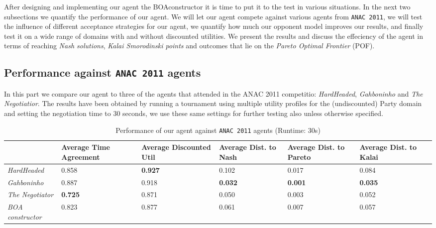 After designing and implementing our agent the BOAconstructor it is time to put it to the test in various situations. In the next two subsections we quantify the performance of our agent. 
We will let our agent compete against various agents from \texttt{ANAC 2011}, we will test the influence of different acceptance strategies for our agent,
we quantify how much our opponent model improves our results, and finally test it on a wide range of domains with and without discounted utilities.
We present the results and discuss the effeciency of the agent in terms of reaching \emph{Nash solutions}, \emph{Kalai Smorodinski points} and outcomes that lie on the \emph{Pareto Optimal Frontier} (POF).

\subsection{Performance against \texttt{ANAC 2011} agents}

In this part we compare our agent to three of the agents that attended in the ANAC 2011 competitio: \emph{HardHeaded}, \emph{Gahboninho} and \emph{The Negotiatior}. The results have been obtained by running a tournament using multiple utility profiles for the (undiscounted) Party domain and setting the negotiation time to $30$ seconds,
we use these same settings for further testing also unless otherwise specified. \\

\begin{table}
	\centering
	\small
    \begin{tabular}{l|p{2cm}|p{2cm}|p{2cm}|p{2cm}|p{2cm}|p{2cm}|}
    ~                                    & Average Time Agreement & Average Discounted Util & Average Dist. to Nash & Average Dist. to Pareto & Average Dist. to Kalai \\
    \hline
    \emph{HardHeaded}		& 0.858               & \textbf{0.927}   & 0.102               & 0.017               & 0.084   \\ \hline
    \emph{Gahboninho}   	& 0.887               & 0.918                & \textbf{0.032}  & \textbf{0.001}  & \textbf{0.035}   \\ \hline
    \emph{The Negotiator} 	& \textbf{0.725}  & 0.871                & 0.050                & 0.003               & 0.052   \\ \hline
    \emph{BOA constructor}  & 0.823               & 0.877                & 0.061                & 0.007               & 0.057   \\ \hline
    \end{tabular}
    \caption{Performance of our agent against \texttt{ANAC 2011} agents (Runtime: $30$s) \label{table:anac2011-results}}
\end{table}

